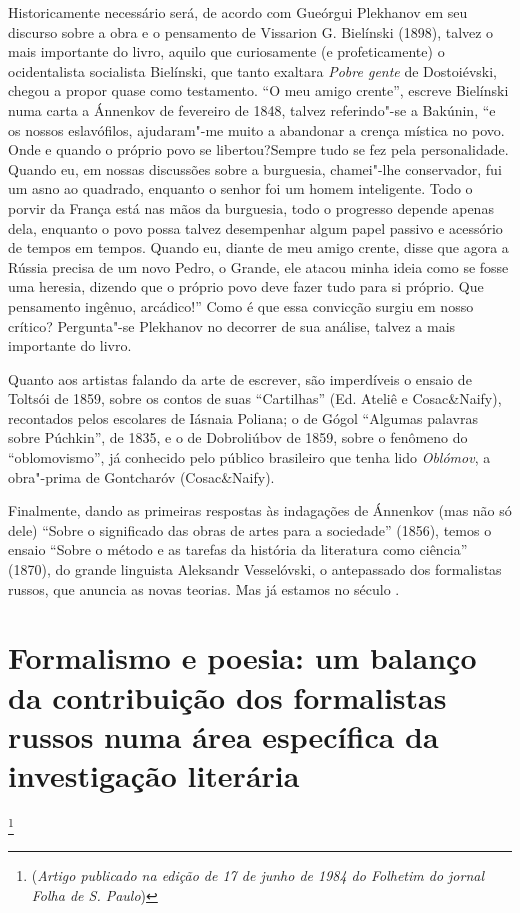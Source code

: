 Historicamente necessário será, de acordo com Gueórgui Plekhanov em seu
discurso sobre a obra e o pensamento de Vissarion G. Bielínski (1898),
talvez o mais importante do livro, aquilo que curiosamente (e
profeticamente) o ocidentalista socialista Bielínski, que tanto
exaltara \emph{Pobre gente} de Dostoiévski, chegou a propor quase como
testamento. ``O meu amigo crente'', escreve Bielínski numa carta a
Ánnenkov de fevereiro de 1848, talvez referindo"-se a Bakúnin, ``e os
nossos eslavófilos, ajudaram"-me muito a abandonar a crença mística no
povo. Onde e quando o próprio povo se libertou?Sempre tudo se fez pela
personalidade. Quando eu, em nossas discussões sobre a burguesia,
chamei"-lhe conservador, fui um asno ao quadrado, enquanto o senhor foi
um homem inteligente. Todo o porvir da França está nas mãos da
burguesia, todo o progresso depende apenas dela, enquanto o povo possa
talvez desempenhar algum papel passivo e acessório de tempos em tempos.
Quando eu, diante de meu amigo crente, disse que agora a Rússia precisa
de um novo Pedro, o Grande, ele atacou minha ideia como se fosse uma
heresia, dizendo que o próprio povo deve fazer tudo para si próprio. Que
pensamento ingênuo, arcádico!'' Como é que essa convicção surgiu em
nosso crítico? Pergunta"-se Plekhanov no decorrer de sua
análise, talvez a mais importante do livro.

Quanto aos artistas falando da arte de escrever, são imperdíveis o
ensaio de Toltsói de 1859, sobre os contos de suas ``Cartilhas'' (Ed.
Ateliê e Cosac\&Naify), recontados pelos escolares de Iásnaia Poliana; o
de Gógol ``Algumas palavras sobre Púchkin'', de 1835, e o de Dobroliúbov
de 1859, sobre o fenômeno do ``oblomovismo'', já conhecido pelo público
brasileiro que tenha lido \emph{Oblómov}, a obra"-prima de Gontcharóv
(Cosac\&Naify).

Finalmente, dando as primeiras respostas às indagações de Ánnenkov (mas
não só dele) ``Sobre o significado das obras de artes para a sociedade''
(1856), temos o ensaio ``Sobre o método e as tarefas da história da
literatura como ciência'' (1870), do grande linguista Aleksandr
Vesselóvski, o antepassado dos formalistas russos, que anuncia as novas
teorias. Mas já estamos no século .

\chapter*{Formalismo e poesia: um balanço da contribuição dos formalistas russos numa
área específica da investigação literária}\footnote{(\emph{Artigo
  publicado na edição de 17 de junho de 1984 do Folhetim do jornal Folha
  de S. Paulo})}

